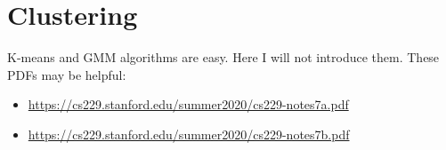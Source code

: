 \section{Clustering}
K-means and GMM algorithms are easy.
Here I will not introduce them.
These PDFs may be helpful:
\begin{itemize}
	\item \href{https://cs229.stanford.edu/summer2020/cs229-notes7a.pdf}{https://cs229.stanford.edu/summer2020/cs229-notes7a.pdf}
	\item \href{https://cs229.stanford.edu/summer2020/cs229-notes7b.pdf}{https://cs229.stanford.edu/summer2020/cs229-notes7b.pdf}
\end{itemize}

